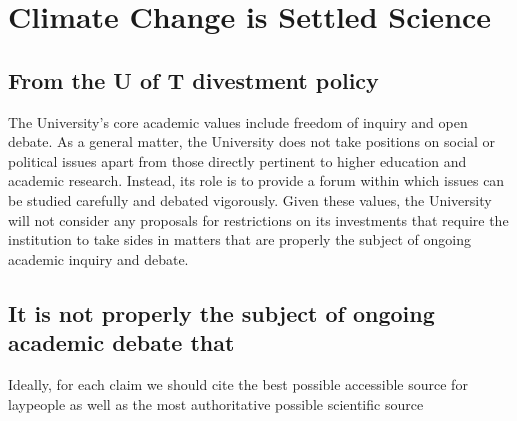 
		\section{Climate Change is Settled Science}


	
	\subsection{From the U of T divestment policy}


\begin{itquote}	
The University’s core academic values include freedom of inquiry and open debate.
As a general matter, the University does not take positions on social or political issues apart from those directly pertinent to higher education and academic research. 
Instead, its role is to provide a forum within which issues can be studied carefully and debated vigorously. 
Given these values, the University will not consider any proposals for restrictions on its investments that require the institution to take sides in matters that are properly the subject of ongoing academic inquiry and debate.
\end{itquote}



	\subsection{It is not properly the subject of ongoing academic debate that}



\textsf{Ideally, for each claim we should cite the best possible accessible source for laypeople as well as the most authoritative possible scientific source}

